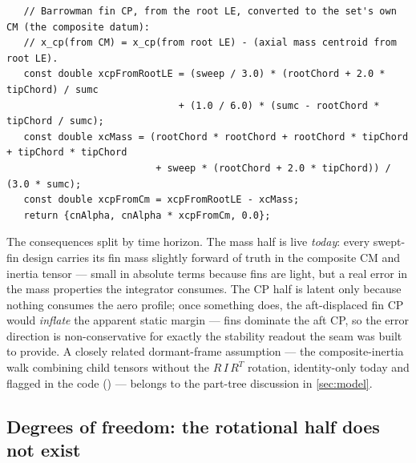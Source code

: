 \begin{listing}[htbp]
\begin{verbatim}
   // Barrowman fin CP, from the root LE, converted to the set's own CM (the composite datum):
   // x_cp(from CM) = x_cp(from root LE) - (axial mass centroid from root LE).
   const double xcpFromRootLE = (sweep / 3.0) * (rootChord + 2.0 * tipChord) / sumc
                              + (1.0 / 6.0) * (sumc - rootChord * tipChord / sumc);
   const double xcMass = (rootChord * rootChord + rootChord * tipChord + tipChord * tipChord
                          + sweep * (rootChord + 2.0 * tipChord)) / (3.0 * sumc);
   const double xcpFromCm = xcpFromRootLE - xcMass;
   return {cnAlpha, cnAlpha * xcpFromCm, 0.0};
\end{verbatim}
\caption{The fin CP conversion (). Both 
and  are aft-positive distances from the leading edge, used directly as offsets in
the \zfwd\ frame --- internally consistent only if the fin flew leading-edge-aft.}
\label{lst:aero-finsign}
\end{listing}

The consequences split by time horizon. The mass half is live \emph{today}: every swept-fin design
carries its fin mass slightly forward of truth in the composite CM and inertia tensor --- small in
absolute terms because fins are light, but a real error in the mass properties the integrator
consumes. The CP half is latent only because nothing consumes the aero profile; once something
does, the aft-displaced fin CP would \emph{inflate} the apparent static margin --- fins dominate
the aft CP, so the error direction is non-conservative for exactly the stability readout the seam
was built to provide. A closely related dormant-frame assumption --- the composite-inertia walk
combining child tensors without the $R\,I\,R^{T}$ rotation, identity-only today and flagged in the
code () --- belongs to the part-tree discussion in \cref{sec:model}.

\subsection{Degrees of freedom: the rotational half does not exist}\label{sec:aero-dof}

